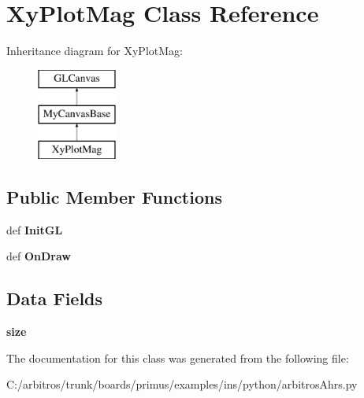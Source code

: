 \hypertarget{classarbitros_ahrs_1_1_xy_plot_mag}{\section{Xy\-Plot\-Mag Class Reference}
\label{classarbitros_ahrs_1_1_xy_plot_mag}
}
Inheritance diagram for Xy\-Plot\-Mag\-:\begin{figure}[H]
\begin{center}
\leavevmode
\includegraphics[height=3.000000cm]{classarbitros_ahrs_1_1_xy_plot_mag}
\end{center}
\end{figure}
\subsection*{Public Member Functions}
\begin{DoxyCompactItemize}
\item 
\hypertarget{classarbitros_ahrs_1_1_xy_plot_mag_aa5d4da6894799e330c531fcff2320723}{def {\bfseries Init\-G\-L}}\label{classarbitros_ahrs_1_1_xy_plot_mag_aa5d4da6894799e330c531fcff2320723}

\item 
\hypertarget{classarbitros_ahrs_1_1_xy_plot_mag_a06264628fa709c57ac53fe3f63080317}{def {\bfseries On\-Draw}}\label{classarbitros_ahrs_1_1_xy_plot_mag_a06264628fa709c57ac53fe3f63080317}

\end{DoxyCompactItemize}
\subsection*{Data Fields}
\begin{DoxyCompactItemize}
\item 
\hypertarget{classarbitros_ahrs_1_1_xy_plot_mag_aa3d6656320f1a7278c0c2c7fdf07617c}{{\bfseries size}}\label{classarbitros_ahrs_1_1_xy_plot_mag_aa3d6656320f1a7278c0c2c7fdf07617c}

\end{DoxyCompactItemize}


The documentation for this class was generated from the following file\-:\begin{DoxyCompactItemize}
\item 
C\-:/arbitros/trunk/boards/primus/examples/ins/python/arbitros\-Ahrs.\-py\end{DoxyCompactItemize}
